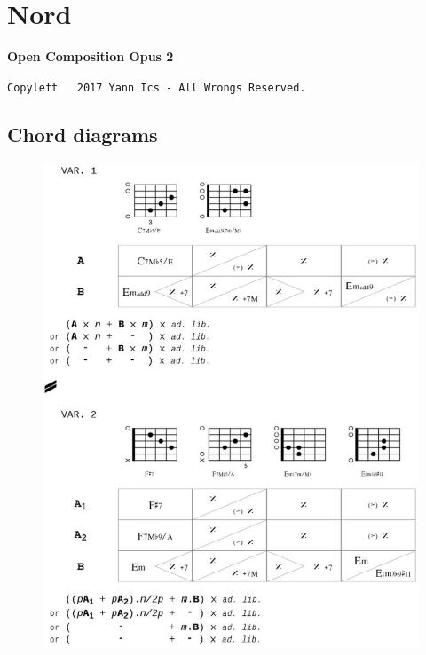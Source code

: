 \newpage
\section*{Nord}
\label{nord}

{}
\thispagestyle{empty}

\begin{center} 
\textbf{Open Composition Opus 2}
\label{oco2}

{\scriptsize  \texttt{Copyleft \textcopyleft \, 2017 Yann Ics - All Wrongs Reserved.}}
 \end{center} 
\vspace{-5mm}
\subsection*{\quad Chord diagrams}
\vspace{-5mm}
 \begin{figure}[H]
\begin{center}
\includegraphics[scale=0.66]{img/tn1}
\end{center}
\end{figure}


